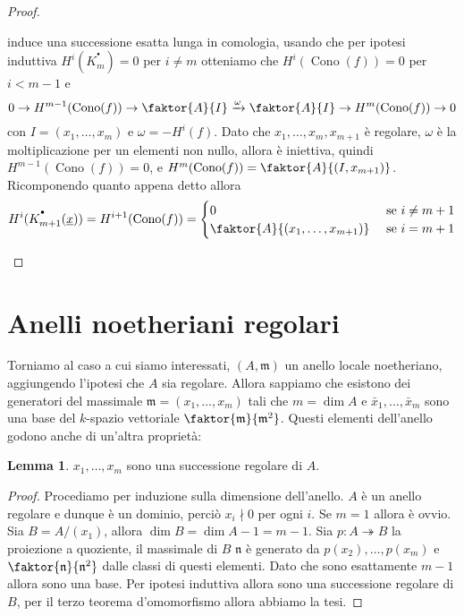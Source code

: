 \documentclass[a4paper,11pt,oneside]{book}
\newcommand{\m}{\mathfrak{m}}
\newcommand{\complx}[1]{#1^{^\bullet}}
\DeclareMathOperator{\Cono}{Cono}
\theoremstyle{definition}
\newtheorem{lemma}{Lemma}
\begin{document}
\begin{proof}
\begin{itemize}
\begin{center}
\begin{tikzpicture}[scale=1.5]
		\end{tikzpicture}
		\end{center}
	      induce una successione esatta lunga in comologia, usando che per ipotesi induttiva $H^i(\complx K_{m})=0$ per $i\neq m$
	      otteniamo che $H^i(\Cono(f))=0$ per $i<m-1$ e
	      \[
	       0\rightarrow H^{m-1}(\Cono(f))\rightarrow \faktor{A}{I}\xrightarrow{\omega} \faktor{A}{I}
	       \rightarrow H^{m}(\Cono(f))\rightarrow 0
	      \]
	      con $I=(x_1,\dots, x_m)$ e $\omega=-H^i(f)$. Dato che $x_1,\dots, x_m,x_{m+1}$ è regolare, 
	      $\omega$ è la moltiplicazione per un elementi non nullo, allora è iniettiva, quindi
	      $H^{m-1}(\Cono(f))=0$, e $H^{m}(\Cono(f)) =\faktor{A}{(I,x_{m+1})}$. Ricomponendo quanto appena detto allora
	      \[
	      H^i(\complx K_{m+1} (\underline x))=H^{i+1}(\Cono(f))=
	      \begin{cases}
	      0 & \text{ se } i\neq m+1 \\
	      \faktor{A}{(x_1,\dots, x_{m+1})}& \text{ se } i= m+1 \\
	      \end{cases}
	      \]
    \end{itemize}
    \end{proof} 

    \section{Anelli noetheriani regolari}
    Torniamo al caso a cui siamo interessati, $(A,\m)$ un anello locale noetheriano, aggiungendo l'ipotesi che $A$ sia regolare.
    Allora sappiamo che esistono dei generatori del massimale $\m=(x_1,\dots, x_{m})$ tali che
    $m=\dim A$ e $\bar x_1,\dots, \bar x_{m}$ sono una base del $k$-spazio vettoriale $\faktor{\m}{\m^2}$. Questi elementi
    dell'anello godono anche di un'altra proprietà:
    
    \begin{lemma}
     $x_1,\dots, x_{m}$ sono una successione regolare di $A$.
    \end{lemma}
    \begin{proof}
     Procediamo per induzione sulla dimensione dell'anello.
     $A$ è un anello regolare e dunque è un dominio, perciò $x_i\nmid 0$ per ogni $i$. Se $m=1$ allora è ovvio.\\
     Sia $B=A/(x_1)$, allora $\dim B=\dim A - 1=m-1$.
     Sia $p\colon A\twoheadrightarrow B$ la proiezione a quoziente, il massimale di $B$ $\mathfrak n$ è generato 
     da $p(x_2),\dots ,p(x_m)$ e $\faktor{\mathfrak n}{\mathfrak n^2}$ dalle classi di questi elementi. Dato che sono esattamente
     $m-1$ allora sono una base. Per ipotesi induttiva allora sono una successione regolare di $B$, per il terzo teorema d'omomorfismo
     allora abbiamo la tesi.
    \end{proof}
\end{document}
